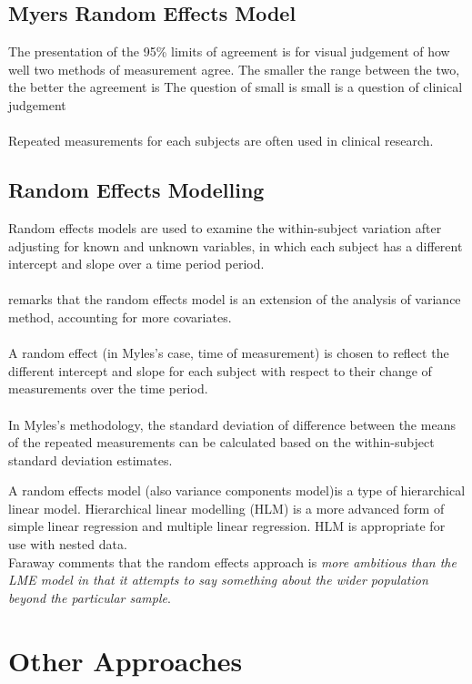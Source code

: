 	\subsection{Myers Random Effects Model} The presentation of the
	95\% limits of agreement is for visual judgement of how well two
	methods of measurement agree. The smaller the range between the
	two, the better the agreement is The question of small is small is
	a question of clinical judgement
	\\
	\\
	Repeated measurements for each subjects are often used in clinical
	research.
	
	\subsection{Random Effects Modelling}
	Random effects models are used to examine the within-subject
	variation after adjusting for known and unknown variables, in
	which each subject has a different intercept and slope over a time
	period period.
	\\
	\\
	\citet{Myles} remarks that the random effects model is an
	extension of the analysis of variance method, accounting for more
	covariates.
	\\
	\\
	A random effect (in Myles's case, time of measurement) is chosen
	to reflect the different intercept and slope for each subject with
	respect to their change of measurements over the time period.
	\\
	\\
	In Myles's methodology, the standard deviation of difference
	between the means of the repeated measurements can be calculated
	based on the within-subject standard deviation estimates.
	
	A random effects model (also variance components model)is a type
	of hierarchical linear model. Hierarchical linear modelling (HLM)
	is a more advanced form of simple linear regression and multiple
	linear regression. HLM is appropriate for use with nested
	data.\\Faraway comments that the random effects approach is
	\emph{more ambitious than the LME model in that it attempts to say
		something about the wider population beyond the particular
		sample}.
	
	
 \section{Other Approaches}

